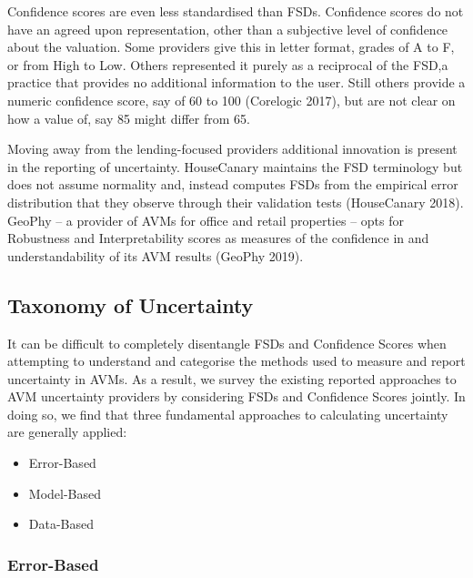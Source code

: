 \documentclass[colTwo]{anon}
\theoremstyle{definition}
\begin{document}
Confidence scores are even less standardised than FSDs.  Confidence scores do not have an agreed upon representation, other than a subjective level of confidence about the valuation.  Some providers give this in letter format, grades of A to F, or from High to Low.  Others represented it purely as a reciprocal of the FSD,a practice that provides no additional information to the user.  Still others provide a numeric confidence score, say of 60 to 100 (Corelogic 2017), but are not clear on how a value of, say 85 might differ from 65.  

Moving away from the lending-focused providers additional innovation is present in the reporting of uncertainty.  HouseCanary maintains the FSD terminology but does not assume normality and, instead computes FSDs from the empirical error distribution that they observe through their validation tests (HouseCanary 2018).  GeoPhy -- a provider of AVMs for office and retail properties -- opts for Robustness and Interpretability scores as measures of the confidence in and understandability of its AVM results (GeoPhy 2019).  

\subsection{Taxonomy of Uncertainty}

It can be difficult to completely disentangle FSDs and Confidence Scores when attempting to understand and categorise the methods used to measure and report uncertainty in AVMs.  As a result, we survey the existing reported approaches to AVM uncertainty providers by 
considering FSDs and Confidence Scores jointly.  In doing so, we find that three fundamental approaches to calculating uncertainty are generally applied: 

\begin{itemize}
\item Error-Based
\item Model-Based
\item Data-Based
\end{itemize}

\subsubsection{Error-Based}
\end{document}
